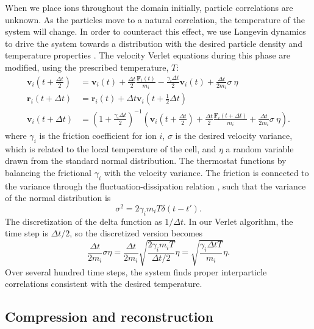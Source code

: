 \documentclass{article}
\begin{document}
When we place ions throughout the domain initially, particle correlations are unknown. As the particles move to a natural correlation, the temperature of the system will change. In order to counteract this effect, we use Langevin dynamics to drive the system towards a distribution with the desired particle density and temperature properties \cite{hunenberger2005thermostat}. The velocity Verlet equations during this phase are modified, using the prescribed temperature, $T$:
\begin{align*}
\mathbf{v}_i\left(t+\frac{\Delta t}{2}\right) &= \mathbf{v}_i(t) + \frac{\Delta t}{2}\frac{\mathbf{F}_i(t)}{m_i} - \frac{\gamma_i\Delta t}{2}\mathbf{v}_i(t) + \frac{\Delta t}{2m_i}\sigma\:\eta \\
\mathbf{r}_i(t+\Delta t) &= \mathbf{r}_i(t) + \Delta t\mathbf{v}_i\left(t+\frac{1}{2}\Delta t\right) \\
\mathbf{v}_i(t+\Delta t) &= \left(1 + \frac{\gamma_i\Delta t}{2}\right)^{-1} \left(\mathbf{v}_i\left(t+\frac{\Delta t}{2}\right) +  \frac{\Delta t}{2}\frac{\mathbf{F}_i(t+\Delta t)}{m_i} + \frac{\Delta t}{2m_i}\sigma\:\eta\right).
\end{align*}
where $\gamma_i$ is the friction coefficient for ion $i$, $\sigma$ is the desired velocity variance, which is related to the local temperature of the cell, and $\eta$ a random variable drawn from the standard normal distribution. The thermostat functions by balancing the frictional $\gamma_i$ with the velocity variance. The friction is connected to the variance through the fluctuation-dissipation relation \cite{kubo1966fluctuation}, such that the variance of the normal distribution is
\[\sigma^2=2\gamma_im_iT\delta(t-t').
\]
The discretization of the delta function as $1/\Delta t$. In our Verlet algorithm, the time step is $\Delta t/2$, so the discretized version becomes
\[\frac{\Delta t}{2m_i}\sigma\eta=\frac{\Delta t}{2m_i}\sqrt{\frac{2\gamma_im_iT}{\Delta t/2}}\eta=\sqrt{\frac{\gamma_i \Delta tT}{m_i}}\eta.
\]
Over several hundred time steps, the system finds proper interparticle correlations consistent with the desired temperature.

\subsection{Compression and reconstruction}
\end{document}
